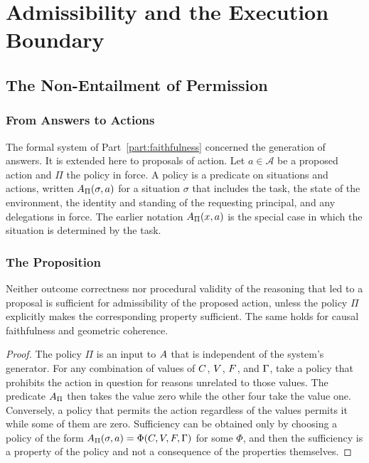 \part{Admissibility and the Execution Boundary}
\label{part:admissibility}

\chapter{The Non-Entailment of Permission}
\label{ch:permission}

\section{From Answers to Actions}

The formal system of Part~\ref{part:faithfulness} concerned the generation of answers. It is extended here to proposals of action. Let $a\in\mathcal A$ be a proposed action and $\Pi$ the policy in force. A policy is a predicate on situations and actions, written $A_\Pi(\sigma,a)$ for a situation $\sigma$ that includes the task, the state of the environment, the identity and standing of the requesting principal, and any delegations in force. The earlier notation $A_\Pi(x,a)$ is the special case in which the situation is determined by the task.

\section{The Proposition}

\begin{proposition}\label{prop:permission}
Neither outcome correctness nor procedural validity of the reasoning that led to a proposal is sufficient for admissibility of the proposed action, unless the policy $\Pi$ explicitly makes the corresponding property sufficient. The same holds for causal faithfulness and geometric coherence.
\end{proposition}

\begin{proof}
The policy $\Pi$ is an input to $A$ that is independent of the system's generator. For any combination of values of $C$, $V$, $F$, and $\Gamma$, take a policy that prohibits the action in question for reasons unrelated to those values. The predicate $A_\Pi$ then takes the value zero while the other four take the value one. Conversely, a policy that permits the action regardless of the values permits it while some of them are zero. Sufficiency can be obtained only by choosing a policy of the form $A_\Pi(\sigma,a)=\Phi(C,V,F,\Gamma)$ for some $\Phi$, and then the sufficiency is a property of the policy and not a consequence of the properties themselves.
\end{proof}

